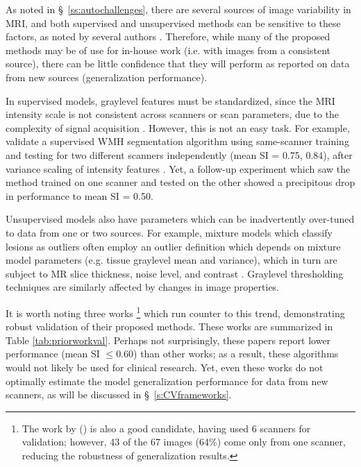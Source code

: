 As noted in \S\ \ref{ss:autochallenges}, there are several sources of image variability in MRI, and both supervised and unsupervised methods can be sensitive to these factors, as noted by several authors \cite{Llado2012,Sweeney2013,Dadar2017}.
Therefore, while many of the proposed methods may be of use for in-house work (i.e. with images from a consistent source), there can be little confidence that they will perform as reported on data from new sources (generalization performance).
\par
In supervised models, graylevel features must be standardized, since the MRI intensity scale is not consistent across scanners or scan parameters, due to the complexity of signal acquisition \cite{Nyul1999}.
However, this is not an easy task.
For example, \citeauthor{Steenwijk2013} validate a supervised WMH segmentation algorithm using same-scanner training and testing for two different scanners independently (mean SI = 0.75, 0.84), after variance scaling of intensity features \cite{Steenwijk2013}.
Yet, a follow-up experiment which saw the method trained on one scanner and tested on the other showed a precipitous drop in performance to mean SI = 0.50.
\par
Unsupervised models also have parameters which can be inadvertently over-tuned to data from one or two sources.
For example, mixture models which classify lesions as outliers often employ an outlier definition which depends on mixture model parameters (e.g. tissue graylevel mean and variance), which in turn are subject to MR slice thickness, noise level, and contrast \cite{VanLeemput2001,Souplet2008,Garcia-Lorenzo2011,Roura2015}.
Graylevel thresholding techniques \cite{Jack2001,Smart2011,Samaille2012,Schmidt2012,Khademi2014} are similarly affected by changes in image properties.
\par
It is worth noting three works%
\footnote{The work by \citeauthor{Samaille2012} (\citeyear{Samaille2012}) \cite{Samaille2012} is also a good candidate, having used 6 scanners for validation; however, 43 of the 67 images (64\%) come only from one scanner, reducing the robustness of generalization results.}
which run counter to this trend, demonstrating robust validation of their proposed methods.
These works are summarized in Table \ref{tab:priorworkval}.
Perhaps not surprisingly, these papers report lower performance (mean SI $\le 0.60$) than other works; as a result, these algorithms would not likely be used for clinical research.
Yet, even these works do not optimally estimate the model generalization performance for data from new scanners, as will be discussed in \S\ \ref{s:CVframeworks}.
